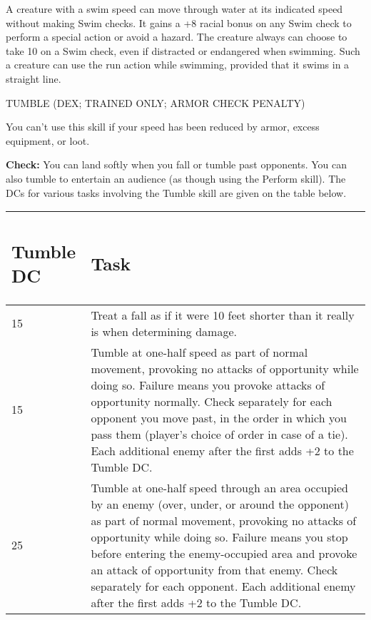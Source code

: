 \documentclass{article}
\begin{document}
A creature with a swim speed can move through water at its indicated speed without 
making Swim checks. It gains a +8 racial bonus on any Swim check to perform a special 
action or avoid a hazard. The creature always can choose to take 10 on a Swim check, 
even if distracted or endangered when swimming. Such a creature can use the run 
action while swimming, provided that it swims in a straight line.

\vspace{12pt}
TUMBLE (DEX; TRAINED ONLY; ARMOR CHECK PENALTY)

You can't use this skill if your speed has been reduced by armor, excess equipment, 
or loot.

\textbf{Check:} You can land softly when you fall or tumble past opponents. You 
can also tumble to entertain an audience (as though using the Perform skill). The 
DCs for various tasks involving the Tumble skill are given on the table below.

\vspace{12pt}
\begin{tabular}{|>{\raggedright}p{23pt}|>{\raggedright}p{303pt}|}
\hline
\subsection*{T\textbf{umble DC }} & \subsection*{T\textbf{ask}}\tabularnewline
\hline
15  & Treat a fall as if it were 10 feet shorter than it really is when determining 
damage.\tabularnewline
\hline
15  & Tumble at one-half speed as part of normal movement, provoking no attacks 
of opportunity while doing so. Failure means you provoke attacks of opportunity 
normally. Check separately for each opponent you move past, in the order in which 
you pass them (player's choice of order in case of a tie).\linebreak{}
Each additional enemy after the first adds +2 to the Tumble DC.\tabularnewline
\hline
25  & Tumble at one-half speed through an area occupied by an enemy (over, under, 
or around the opponent) as part of normal movement, provoking no attacks of opportunity 
while doing so. Failure means you stop before entering the enemy-occupied area 
and provoke an attack of opportunity from that enemy.\linebreak{}
Check separately for each opponent. Each additional enemy after the first adds 
+2 to the Tumble DC.\tabularnewline
\hline
\end{tabular}
\end{document}

